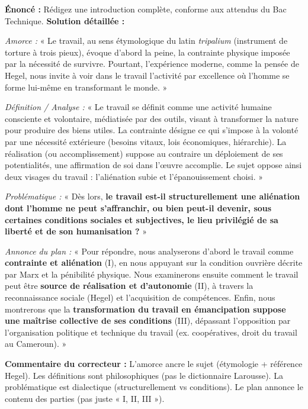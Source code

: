 \documentclass[11pt]{article}
\newcommand{\cle}[1]{{\popxbold\color{popdark}#1}}
\begin{document}
\begin{exoresolu}
\textbf{Énoncé :} Rédigez une introduction complète, conforme aux attendus du Bac Technique.
\tcblower
\textbf{Solution détaillée :}

\textit{Amorce :} « Le travail, au sens étymologique du latin \emph{tripalium} (instrument de torture à trois pieux), évoque d'abord la peine, la contrainte physique imposée par la nécessité de survivre. Pourtant, l'expérience moderne, comme la pensée de Hegel, nous invite à voir dans le travail l'activité par excellence où l'homme se forme lui-même en transformant le monde. »

\textit{Définition / Analyse :} « Le \cle{travail} se définit comme une activité humaine consciente et volontaire, médiatisée par des outils, visant à transformer la nature pour produire des biens utiles. La \cle{contrainte} désigne ce qui s'impose à la volonté par une nécessité extérieure (besoins vitaux, lois économiques, hiérarchie). La \cle{réalisation} (ou accomplissement) suppose au contraire un déploiement de ses potentialités, une affirmation de soi dans l'œuvre accomplie. Le sujet oppose ainsi deux visages du travail : l'aliénation subie et l'épanouissement choisi. »

\textit{Problématique :} « Dès lors, \textbf{le travail est-il structurellement une aliénation dont l'homme ne peut s'affranchir, ou bien peut-il devenir, sous certaines conditions sociales et subjectives, le lieu privilégié de sa liberté et de son humanisation ?} »

\textit{Annonce du plan :} « Pour répondre, nous analyserons d'abord le travail comme \textbf{contrainte et aliénation} (I), en nous appuyant sur la condition ouvrière décrite par Marx et la pénibilité physique. Nous examinerons ensuite comment le travail peut être \textbf{source de réalisation et d'autonomie} (II), à travers la reconnaissance sociale (Hegel) et l'acquisition de compétences. Enfin, nous montrerons que la \textbf{transformation du travail en émancipation suppose une maîtrise collective de ses conditions} (III), dépassant l'opposition par l'organisation politique et technique du travail (ex. coopératives, droit du travail au Cameroun). »

\textbf{Commentaire du correcteur :} L'amorce ancre le sujet (étymologie + référence Hegel). Les définitions sont philosophiques (pas le dictionnaire Larousse). La problématique est dialectique (structurellement vs conditions). Le plan annonce le contenu des parties (pas juste « I, II, III »).
\end{exoresolu}
\end{document}
